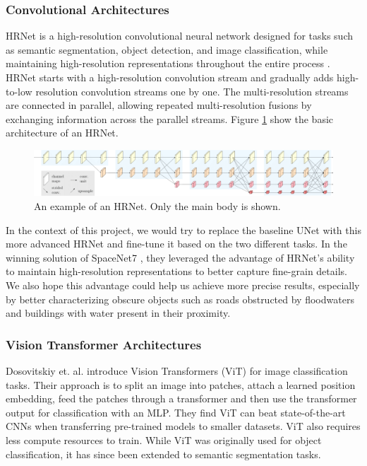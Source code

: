 \documentclass[10pt,twocolumn,letterpaper]{article}
\begin{document}
\subsubsection{Convolutional Architectures}
HRNet is a high-resolution convolutional neural network designed for tasks such as semantic segmentation, object detection, and image classification, while maintaining high-resolution representations throughout the entire process \cite{hrnet}. HRNet starts with a high-resolution convolution stream and gradually adds high-to-low resolution convolution streams one by one. The multi-resolution streams are connected in parallel, allowing repeated multi-resolution fusions by exchanging information across the parallel streams. Figure \ref{fig:HRNet} show the basic architecture of an HRNet. 

\begin{figure}[t]
  \centering
   \includegraphics[width=1\linewidth]{figures/HRNet.png}
   \caption{An example of an HRNet. Only the main body is shown.}
   \label{fig:HRNet}
\end{figure}

In the context of this project, we would try to replace the baseline UNet with this more advanced HRNet and fine-tune it based on the two different tasks. In the winning solution of SpaceNet7 \cite{spacenet7_winning}, they leveraged the advantage of HRNet’s ability to maintain high-resolution representations to better capture fine-grain details. We also hope this advantage could help us achieve more precise results, especially by better characterizing obscure objects such as roads obstructed by floodwaters and buildings with water present in their proximity.

\subsubsection{Vision Transformer Architectures}
Dosovitskiy et. al. introduce Vision Transformers (ViT) \cite{dosovitskiy2021image} for image classification tasks. Their approach is to split an image into patches, attach a learned position embedding, feed the patches through a transformer and then use the transformer output for classification with an MLP. They find ViT can beat state-of-the-art CNNs when transferring pre-trained models to smaller datasets. ViT also requires less compute resources to train. While ViT was originally used for object classification, it has since been extended to semantic segmentation tasks.
\end{document}
